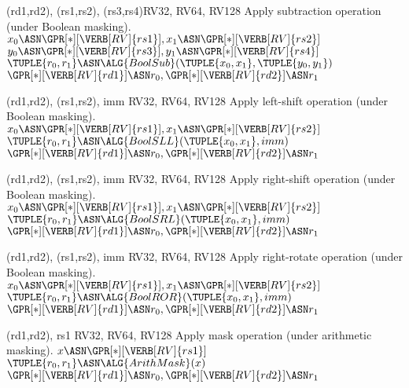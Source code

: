 
   {(rd1,rd2), (rs1,rs2), (rs3,rs4)}{RV32, RV64, RV128}{
  Apply  subtraction operation 
  (under Boolean    masking).
}{
  $x_0 \ASN \GPR[*][{\VERB[RV]{rs1}}], x_1 \ASN \GPR[*][{\VERB[RV]{rs2}}]$ \;
  $y_0 \ASN \GPR[*][{\VERB[RV]{rs3}}], y_1 \ASN \GPR[*][{\VERB[RV]{rs4}}]$ \;
  $\TUPLE{ r_0, r_1 } \ASN \ALG {BoolSub}( \TUPLE{ x_0, x_1 }, \TUPLE{ y_0, y_1 } )$ \;
  $\GPR[*][{\VERB[RV]{rd1}}] \ASN r_0, \GPR[*][{\VERB[RV]{rd2}}] \ASN r_1$ \;
}


  {(rd1,rd2), (rs1,rs2), imm}      {RV32, RV64, RV128}{
  Apply  left-shift  operation 
  (under Boolean    masking).
}{
  $x_0 \ASN \GPR[*][{\VERB[RV]{rs1}}], x_1 \ASN \GPR[*][{\VERB[RV]{rs2}}]$ \;
  $\TUPLE{ r_0, r_1 } \ASN \ALG {BoolSLL}( \TUPLE{ x_0, x_1 }, imm                )$ \;
  $\GPR[*][{\VERB[RV]{rd1}}] \ASN r_0, \GPR[*][{\VERB[RV]{rd2}}] \ASN r_1$ \;
}


  {(rd1,rd2), (rs1,rs2), imm}      {RV32, RV64, RV128}{
  Apply right-shift  operation 
  (under Boolean    masking).
}{
  $x_0 \ASN \GPR[*][{\VERB[RV]{rs1}}], x_1 \ASN \GPR[*][{\VERB[RV]{rs2}}]$ \;
  $\TUPLE{ r_0, r_1 } \ASN \ALG {BoolSRL}( \TUPLE{ x_0, x_1 }, imm                )$ \;
  $\GPR[*][{\VERB[RV]{rd1}}] \ASN r_0, \GPR[*][{\VERB[RV]{rd2}}] \ASN r_1$ \;
}


  {(rd1,rd2), (rs1,rs2), imm}      {RV32, RV64, RV128}{
  Apply right-rotate operation 
  (under Boolean    masking).
}{
  $x_0 \ASN \GPR[*][{\VERB[RV]{rs1}}], x_1 \ASN \GPR[*][{\VERB[RV]{rs2}}]$ \;
  $\TUPLE{ r_0, r_1 } \ASN \ALG {BoolROR}( \TUPLE{ x_0, x_1 }, imm                )$ \;
  $\GPR[*][{\VERB[RV]{rd1}}] \ASN r_0, \GPR[*][{\VERB[RV]{rd2}}] \ASN r_1$ \;
}


  {(rd1,rd2), rs1}                 {RV32, RV64, RV128}{
  Apply         mask operation 
  (under arithmetic masking).
}{
  $x   \ASN \GPR[*][{\VERB[RV]{rs1}}]                                    $ \;
  $\TUPLE{ r_0, r_1 } \ASN \ALG{ArithMask}  (         x          )$ \;
  $\GPR[*][{\VERB[RV]{rd1}}] \ASN r_0, \GPR[*][{\VERB[RV]{rd2}}] \ASN r_1$ \;    
}

